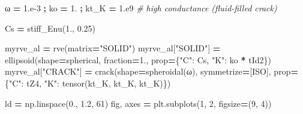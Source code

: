 \documentclass[
  a4paper,
  numbers=noendperiod,
  DIV=12]{scrreprt}
\newenvironment{Shaded}{\begin{snugshade}}{\end{snugshade}}
\newcommand{\CommentTok}[1]{\textcolor[rgb]{0.56,0.35,0.01}{\textit{#1}}}
\newcommand{\DecValTok}[1]{\textcolor[rgb]{0.00,0.00,0.81}{#1}}
\newcommand{\FloatTok}[1]{\textcolor[rgb]{0.00,0.00,0.81}{#1}}
\newcommand{\NormalTok}[1]{#1}
\newcommand{\OperatorTok}[1]{\textcolor[rgb]{0.81,0.36,0.00}{\textbf{#1}}}
\newcommand{\StringTok}[1]{\textcolor[rgb]{0.31,0.60,0.02}{#1}}
\begin{document}
\begin{Shaded}
\begin{Highlighting}[]
\NormalTok{ω }\OperatorTok{=} \FloatTok{1.e{-}3} \OperatorTok{;}\NormalTok{ ko }\OperatorTok{=} \FloatTok{1.} \OperatorTok{;}\NormalTok{ kt\_K }\OperatorTok{=} \FloatTok{1.e9}   \CommentTok{\# high conductance (fluid{-}filled crack)}

\NormalTok{Cs }\OperatorTok{=}\NormalTok{ stiff\_Enu(}\FloatTok{1.}\NormalTok{, }\FloatTok{0.25}\NormalTok{)}

\NormalTok{myrve\_al }\OperatorTok{=}\NormalTok{ rve(matrix}\OperatorTok{=}\StringTok{"SOLID"}\NormalTok{)}
\NormalTok{myrve\_al[}\StringTok{"SOLID"}\NormalTok{] }\OperatorTok{=}\NormalTok{ ellipsoid(shape}\OperatorTok{=}\NormalTok{spherical, fraction}\OperatorTok{=}\FloatTok{1.}\NormalTok{,}
\NormalTok{                               prop}\OperatorTok{=}\NormalTok{\{}\StringTok{"C"}\NormalTok{: Cs, }\StringTok{"K"}\NormalTok{: ko }\OperatorTok{*}\NormalTok{ tId2\})}
\NormalTok{myrve\_al[}\StringTok{"CRACK"}\NormalTok{] }\OperatorTok{=}\NormalTok{ crack(shape}\OperatorTok{=}\NormalTok{spheroidal(ω), symmetrize}\OperatorTok{=}\NormalTok{[ISO],}
\NormalTok{                           prop}\OperatorTok{=}\NormalTok{\{}\StringTok{"C"}\NormalTok{: tZ4, }\StringTok{"K"}\NormalTok{: tensor(kt\_K, kt\_K, kt\_K)\})}

\NormalTok{ld }\OperatorTok{=}\NormalTok{ np.linspace(}\FloatTok{0.}\NormalTok{, }\FloatTok{1.2}\NormalTok{, }\DecValTok{61}\NormalTok{)}
\NormalTok{fig, axes }\OperatorTok{=}\NormalTok{ plt.subplots(}\DecValTok{1}\NormalTok{, }\DecValTok{2}\NormalTok{, figsize}\OperatorTok{=}\NormalTok{(}\DecValTok{9}\NormalTok{, }\DecValTok{4}\NormalTok{))}


\end{Highlighting}
\end{Shaded}
\end{document}
